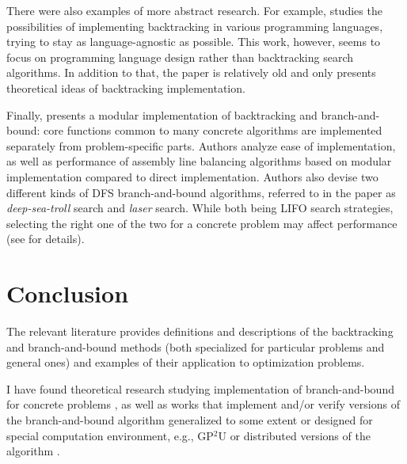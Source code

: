 There were also examples of more abstract research. For example,
\cite{prenner1972proglangs} studies the possibilities of implementing
backtracking in various programming languages, trying to stay as language-agnostic
as possible. This work, however, seems to focus on programming language design
rather than backtracking search algorithms. In addition to that, the paper is relatively old and
only presents theoretical ideas of backtracking implementation.

Finally, \cite{johnson1988modular} presents a modular implementation of backtracking and
branch-and-bound: core functions common to many concrete algorithms are implemented separately
from problem-specific parts. Authors analyze ease of implementation, as well as performance
of assembly line balancing algorithms based on modular implementation compared to direct
implementation. Authors also devise two different kinds of DFS branch-and-bound algorithms,
referred to in the paper as \emph{deep-sea-troll} search and \emph{laser} search. While both
being LIFO search strategies, selecting the right one of the two for a concrete  problem may
affect performance (see \cite{johnson1988modular} for details).

\section{Conclusion}

The relevant literature provides definitions and descriptions of the backtracking and
branch-and-bound methods (both specialized for particular problems and general ones) and
examples of their application to optimization problems.

I have found theoretical research studying implementation
of branch-and-bound for concrete problems
\cite{clausen1999principles, bard1990bilevel, indriyono2024sudoku},
as well as works that implement and/or verify versions of the branch-and-bound algorithm
generalized to some extent
\cite{narkawicz2013formalnasa, johnson1988modular}
or designed for special computation environment, e.g., GP$^2$U \cite{lalami2012gpu} or
distributed versions of the algorithm \cite{voloshinov2017implementation,
finkel1987distrib}.

